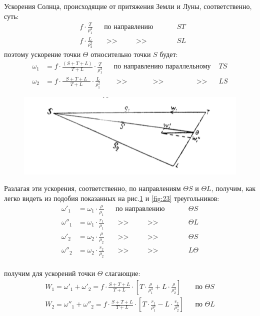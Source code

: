\documentclass[a4paper,12pt]{article}
\begin{document}
Ускорения Солнца, происходящие от притяжения Земли и Луны, соответственно, суть:
\[
\begin{aligned}
	&f \cdot \frac{T}{\rho_1^2} & &\text{по направлению } &ST \\
	&f \cdot \frac{L}{\rho_2^2} & &\text{ >> } \qquad \text{ >> } \qquad \quad \, &SL
\end{aligned}
\]
поэтому ускорение точки $\Theta$ относительно точки $S$ будет:
\[
\begin{aligned}
	\omega_1 &= f \cdot \frac{(S + T + L)}{T + L} \cdot \frac{T}{\rho_1^2} & &\text{по направлению параллельному } &TS \\
	\omega_2 &= f \cdot \frac{\text{ } S + T + L\text{ }}{T + L} \cdot \frac{L}{\rho_1^2} & &\text{ >> } \qquad \quad \text{ >> } \qquad \quad \quad \text{ >> }  &LS
\end{aligned}
\]


\begin{figure}
	\includegraphics[width=\linewidth]{22.png}
	\caption{}
	\label{fig:22}
\end{figure}Разлагая эти ускорения, соответственно, по направлениям $\Theta S$ и $\Theta L$, получим, как легко видеть из подобия показанных на рис.\ref{fig:22} и \ref{fig:23} треугольников: 
\[
\begin{aligned}
	\omega'_1 &= \omega_1 \cdot \frac{\rho}{\rho_1} & &\text{по направлению } &\Theta S \\
	\omega''_1 &= \omega_1 \cdot \frac{r_1}{\rho_1} & &\text{ >> } \qquad \text{ >> } \qquad \quad \, &\Theta L\\
	\omega'_2 &= \omega_2 \cdot \frac{\rho}{\rho_2} & &\text{ >> } \qquad \text{ >> } \qquad \quad \, &\Theta S \\
	\omega''_2 &= \omega_2 \cdot \frac{r_2}{\rho_2} & &\text{ >> } \qquad \text{ >> } \qquad \quad \, &L \Theta 
\end{aligned}
\]\\
получим для ускорений точки $\Theta$ слагающие:
\[
\begin{aligned}
	W_1 = \omega'_1 + \omega'_2 = f \cdot \frac{S + T + L}{T + L} \cdot 
	\left[  T \cdot \frac{\rho}{\rho_1^3} + L \cdot \frac{\rho}{\rho_2^3}\right] &&\text{по } \Theta S \\
	W_2 = \omega''_1 + \omega''_2 = f \cdot \frac{S + T + L}{T + L} \cdot
	\left[  T \cdot \frac{r_1}{\rho_1^3} - L \cdot \frac{r_2}{\rho_2^3}\right] &&\text{по } \Theta L
\end{aligned}
\]
\end{document}
